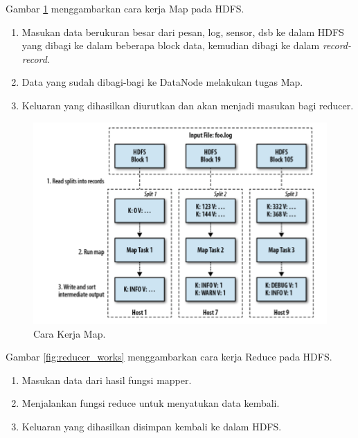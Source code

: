 Gambar \ref{fig:mapper_works} menggambarkan cara kerja Map pada HDFS. 
\begin{enumerate}
	\item Masukan data berukuran besar dari pesan, log, sensor, dsb ke dalam HDFS yang dibagi ke dalam beberapa block data, kemudian dibagi ke dalam \textit{record-record}.
	\item Data yang sudah dibagi-bagi ke DataNode melakukan tugas Map. 
	\item Keluaran yang dihasilkan diurutkan dan akan menjadi masukan bagi reducer.
\end{enumerate}


\begin{figure}
	\centering
	\includegraphics[scale=0.5]{Gambar/how-mapper-works.png}
	\caption[Cara  Kerja Map]{Cara Kerja Map.\cite{sammer2012hadoop}}
	\label{fig:mapper_works}
\end{figure}

Gambar \ref{fig:reducer_works} menggambarkan cara kerja Reduce pada HDFS.
\begin{enumerate}
	\item Masukan data dari hasil fungsi mapper.
	\item Menjalankan fungsi reduce untuk menyatukan data kembali.
	\item Keluaran yang dihasilkan disimpan kembali ke dalam HDFS.
\end{enumerate}


